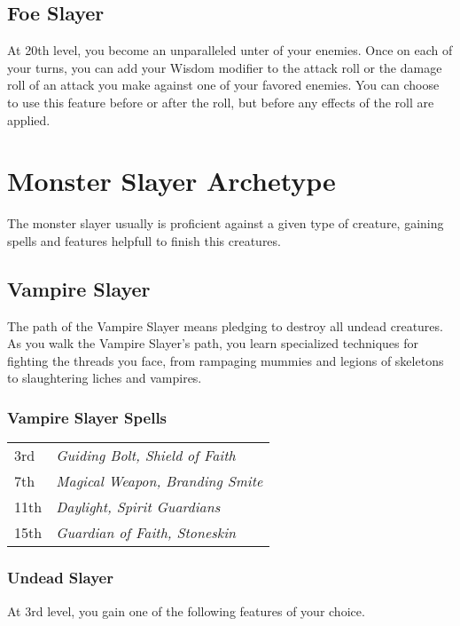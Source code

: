 \documentclass[11pt,a4paper,twocolumn, sans]{article}
\begin{document}
	\subsection*{Foe Slayer}
	At 20th level, you become an unparalleled unter of your enemies. Once on each of your turns, you can add your Wisdom modifier to the attack roll or the damage roll of an attack you make against one of your favored enemies. You can choose to use this feature before or after the roll, but before any effects of the roll are	applied.
	
	\section*{Monster Slayer Archetype}
	The monster slayer usually is proficient against a given type of creature, gaining spells and features helpfull to finish this creatures.
	
	\subsection*{Vampire Slayer}
	The path of the Vampire Slayer means pledging to destroy all undead creatures. As you walk the Vampire Slayer's path, you learn specialized techniques for fighting the threads you face, from rampaging mummies and legions of skeletons to slaughtering liches and vampires.
	
	\subsubsection*{Vampire Slayer Spells}
	\begin{tabular}{ll}
		3rd & \textit{Guiding Bolt, Shield of Faith} \\
		7th & \textit{Magical Weapon, Branding Smite} \\
		11th & \textit{Daylight, Spirit Guardians} \\
		15th & \textit{Guardian of Faith, Stoneskin} \\
	\end{tabular}

	\subsubsection*{Undead Slayer}
	At 3rd level, you gain one of the following features of your choice.
	
\end{document}
